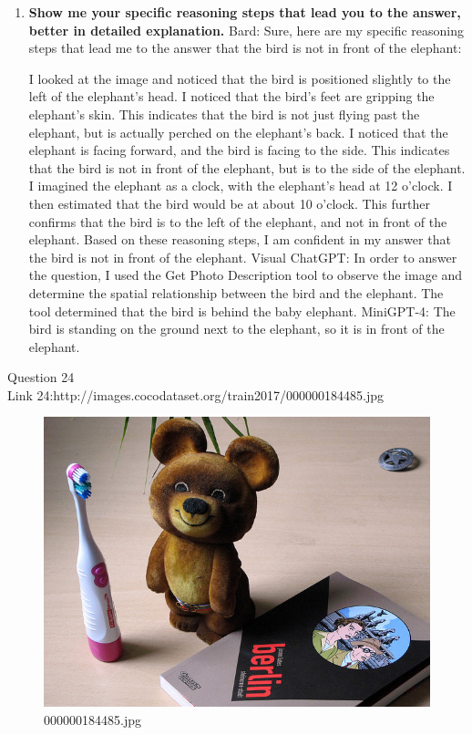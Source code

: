 \begin{enumerate}
        If you imagine the elephant as a clock, with the elephant's head at 12 o'clock, the bird would be at about 10 o'clock. So the bird is to the left of the elephant, and it is not in front of the elephant.
        \subitem Visual ChatGPT: In the image, the bird is behind the baby elephant.
        \subitem MiniGPT-4: Yes, the bird is in front of the elephant.
        \item \textbf{Show me your specific reasoning steps that lead you to the answer, better in detailed explanation.}
        \subitem Bard: 
        Sure, here are my specific reasoning steps that lead me to the answer that the bird is not in front of the elephant:
        
        I looked at the image and noticed that the bird is positioned slightly to the left of the elephant's head.
        I noticed that the bird's feet are gripping the elephant's skin. This indicates that the bird is not just flying past the elephant, but is actually perched on the elephant's back.
        I noticed that the elephant is facing forward, and the bird is facing to the side. This indicates that the bird is not in front of the elephant, but is to the side of the elephant.
        I imagined the elephant as a clock, with the elephant's head at 12 o'clock. I then estimated that the bird would be at about 10 o'clock. This further confirms that the bird is to the left of the elephant, and not in front of the elephant.
        Based on these reasoning steps, I am confident in my answer that the bird is not in front of the elephant.
        \subitem Visual ChatGPT: In order to answer the question, I used the Get Photo Description tool to observe the image and determine the spatial relationship between the bird and the elephant. The tool determined that the bird is behind the baby elephant.
        \subitem MiniGPT-4: The bird is standing on the ground next to the elephant, so it is in front of the elephant.
    \end{enumerate}
Question 24\\
Link 24:http://images.cocodataset.org/train2017/000000184485.jpg
    \begin{figure}[h]
        \centering
        \includegraphics[width=0.8\linewidth]{../image set/easy/000000184485.jpg}
        \caption{000000184485.jpg}
    \end{figure}
